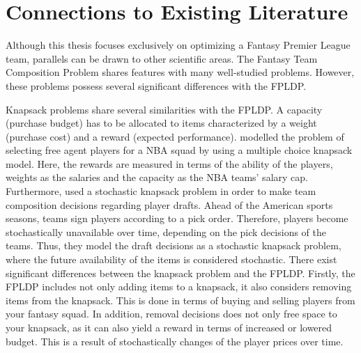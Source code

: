 \section{Connections to Existing Literature}\label{Other_Relevant_Research}
Although this thesis focuses exclusively on optimizing a Fantasy Premier League team, parallels can be drawn to other scientific areas. The Fantasy Team Composition Problem shares features with many well-studied problems. However, these problems possess several significant differences with the FPLDP. 

\newpar

Knapsack problems share several similarities with the FPLDP. A capacity (purchase budget) has to be allocated to items characterized by a weight (purchase cost) and a reward (expected performance). \cite{Kirshner} modelled the problem of selecting free agent players for a NBA squad by using a multiple choice knapsack model. Here, the rewards are measured in terms of the ability of the players, weights as the salaries and the capacity as the NBA teams' salary cap. Furthermore, \cite{Gibson} used a stochastic knapsack problem in order to make team composition decisions regarding player drafts. 
Ahead of the American sports seasons, teams sign players according to a pick order. Therefore, players become stochastically unavailable over time, depending on the pick decisions of the teams. Thus, they model the draft decisions as a stochastic knapsack problem, where the future availability of the items is considered stochastic. There exist significant differences between the knapsack problem and the FPLDP. Firstly, the FPLDP includes not only adding items to a knapsack, it also considers removing items from the knapsack. This is done in terms of buying and selling players from your fantasy squad. In addition, removal decisions does not only free space to your knapsack, as it can also yield a reward in terms of increased or lowered budget. This is a result of stochastically changes of the player prices over time. 
\newpar
